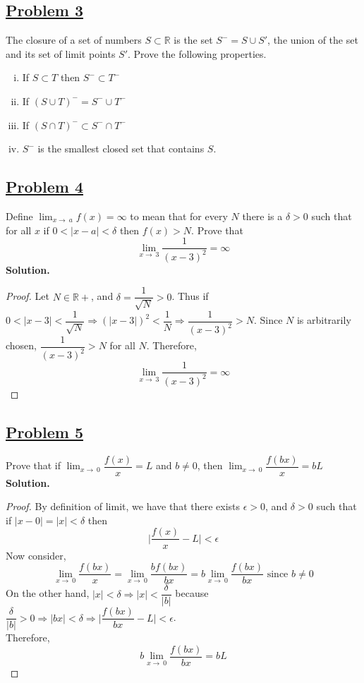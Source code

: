 \documentclass[10pt,letterpaper]{article}
\begin{document}
	\subsection*{{\color{purple}\underline{Problem 3}}}
	The closure of a set of numbers $S \subset \mathbb{R}$ is the set $S^{-} = S \cup S'$, the union of the set
	and its set of limit points $S'$. Prove the following properties.
	\begin{enumerate}[(i)]
		\item If $S \subset T$ then $S^{-} \subset T^{-}$
		\item If $(S \cup T)^{-} = S^{-} \cup T^{-}$
		\item If $(S \cap T)^{-} \subset S^{-} \cap T^{-}$
		\item $S^{-}$ is the smallest closed set that contains $S$.
	\end{enumerate}
	
	\subsection*{{\color{purple}\underline{Problem 4}}}
	Define $\displaystyle\lim_{x\to\ a}f(x) = \infty$ to mean that for every $N$ there is
	a $\delta > 0$ such that for all $x$ if $0 < |x - a| < \delta$ then $f(x) > N$. Prove that 
	$$\displaystyle\lim_{x\to\ 3}\dfrac{1}{(x - 3)^2} = \infty$$
	\textbf{Solution.}
	\begin{proof}
		Let $N \in \mathbb{R+}$, and $\delta = \dfrac{1}{\sqrt{N}} > 0$. Thus if 
		$0 < |x - 3| < \dfrac{1}{\sqrt{N}} \Rightarrow (|x - 3|)^2 < \dfrac{1}{N}
		\Rightarrow \dfrac{1}{(x - 3)^2} > N$. Since $N$ is arbitrarily chosen,
		$\dfrac{1}{(x - 3)^2} > N$ for all $N$. Therefore,
		$$\displaystyle\lim_{x\to\ 3}\dfrac{1}{(x - 3)^2} = \infty$$
	\end{proof}
	
	\subsection*{{\color{purple}\underline{Problem 5}}}
	Prove that if $\displaystyle\lim_{x\to\ 0} \dfrac{f(x)}{x} = L$ and $b \neq 0$, then 
	$\displaystyle\lim_{x\to\ 0} \dfrac{f(bx)}{x} = bL$ \\
	\textbf{Solution. }
	\begin{proof}
		By definition of limit, we have that there exists $\epsilon > 0$, and $\delta > 0$
		such that if $|x - 0| = |x| < \delta$ then 
		$$\bigg|\dfrac{f(x)}{x} - L\bigg| < \epsilon$$
		Now consider,
		$$\displaystyle\lim_{x\to\ 0} \dfrac{f(bx)}{x} 
		= \displaystyle\lim_{x\to\ 0} \dfrac{bf(bx)}{bx}
		= b \displaystyle\lim_{x\to\ 0} \dfrac{f(bx)}{bx}
		\text{ since } b \neq 0$$
		On the other hand, $|x| < \delta \Rightarrow |x| < \dfrac{\delta}{|b|}$ because $\dfrac{\delta}{|b|} > 0
		\Rightarrow |bx| < \delta \Rightarrow \bigg|\dfrac{f(bx)}{bx} - L\bigg| < \epsilon$. \\
		Therefore,
		$$b \displaystyle\lim_{x\to\ 0} \dfrac{f(bx)}{bx} = bL$$
	\end{proof}
	
\end{document}

